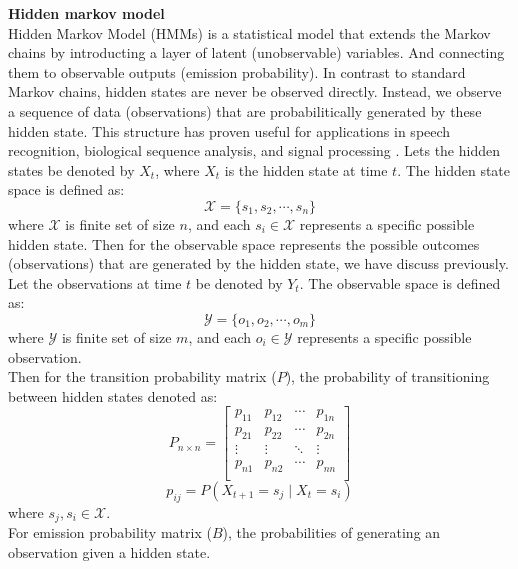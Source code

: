 \documentclass[12pt,a4paper]{article}
\begin{document}
\textbf{Hidden markov model}
\\[1ex]
Hidden Markov Model (HMMs) is a statistical model that extends the Markov chains by introducting a layer of latent (unobservable) variables. And connecting them to observable outputs (emission probability). In contrast to standard Markov chains, hidden states are never be observed directly. Instead, we observe a sequence of data (observations) that are probabilitically generated by these hidden state. This structure has proven useful for applications in speech recognition, biological sequence analysis, and signal processing \parencite{rabiner1989atutorial}. Lets the hidden states be denoted by $X_t$, where $X_t$ is the hidden state at time $t$. The hidden state space is defined as:
\begin{equation}
    \mathcal{X} = \{s_1, s_2, \cdots, s_n\}
\end{equation}
where $\mathcal{X}$ is finite set of size $n$, and each $s_i \in \mathcal{X}$ represents a specific possible hidden state. Then for the observable space represents the possible outcomes (observations) that are generated by the hidden state, we have discuss previously. Let the observations at time $t$ be denoted by $Y_t$. The observable space is defined as:
\begin{equation}
    \mathcal{Y} = \{o_1, o_2, \cdots, o_m\}
\end{equation}
where $\mathcal{Y}$ is finite set of size $m$, and each $o_i \in \mathcal{Y}$ represents a specific possible observation. 
\\[1ex]
Then for the transition probability matrix ($P$), the probability of transitioning between hidden states denoted as:
\begin{equation}
    P_{n \times n} = 
    \left[ {\begin{array}{cccc}
        p_{11} & p_{12} & \cdots & p_{1n}\\
        p_{21} & p_{22} & \cdots & p_{2n}\\
        \vdots & \vdots & \ddots & \vdots\\
        p_{n1} & p_{n2} & \cdots & p_{nn}\\
    \end{array} } \right]
\end{equation}
\begin{equation}
    p_{ij} = P(X_{t+1} = s_j \mid X_t = s_i) 
\end{equation}
where $s_j, s_i \in \mathcal{X}$.
\\[1ex]
For emission probability matrix ($B$), the probabilities of generating an observation given a hidden state.
\end{document}
